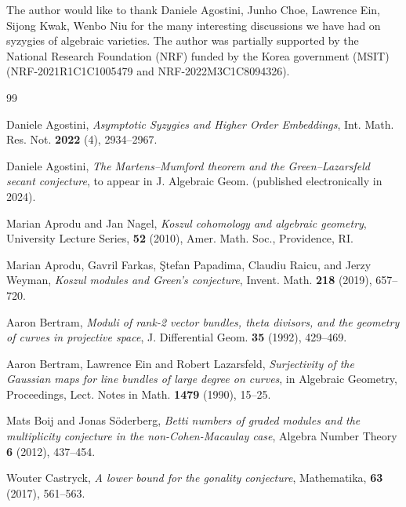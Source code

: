 \documentclass[graybox]{svmult}
\begin{document}
\begin{acknowledgement}
The author would like to thank Daniele Agostini, Junho Choe, Lawrence Ein, Sijong Kwak, Wenbo Niu for the many interesting discussions we have had on syzygies of algebraic varieties. The author was partially supported by the National Research Foundation (NRF) funded by the Korea government (MSIT) (NRF-2021R1C1C1005479 and NRF-2022M3C1C8094326).\\[-15pt]
\end{acknowledgement}



\begin{thebibliography}{99}

Daniele Agostini, \textit{Asymptotic Syzygies and Higher Order Embeddings}, Int. Math. Res. Not. \textbf{2022} (4), 2934--2967.

Daniele Agostini, \textit{The Martens--Mumford theorem and the Green--Lazarsfeld secant conjecture}, to appear in J. Algebraic Geom. (published electronically in 2024).

Marian Aprodu and Jan Nagel, \textit{Koszul cohomology and algebraic geometry}, University Lecture Series, \textbf{52} (2010), Amer. Math. Soc., Providence, RI.
	

Marian Aprodu, Gavril Farkas, \c{S}tefan Papadima, Claudiu Raicu, and Jerzy Weyman, \textit{Koszul modules and Green's conjecture}, Invent. Math. \textbf{218} (2019),  657--720.

 Aaron Bertram, \textit{Moduli of rank-2 vector bundles, theta divisors, and the geometry of curves in projective space}, J. Differential Geom. \textbf{35} (1992), 429--469.
	
Aaron Bertram, Lawrence Ein and Robert Lazarsfeld, \textit{Surjectivity of the Gaussian maps for line bundles of large degree on curves}, in Algebraic Geometry, Proceedings, Lect. Notes in Math. \textbf{1479} (1990), 15--25.

Mats Boij and Jonas S\"{o}derberg,  \textit{Betti numbers of graded modules and the multiplicity conjecture in the non-Cohen-Macaulay case}, Algebra Number Theory \textbf{6} (2012), 437--454.

Wouter Castryck, \textit{A lower bound for the gonality conjecture}, Mathematika, \textbf{63} (2017), 561--563.


\end{thebibliography}
\end{document}
